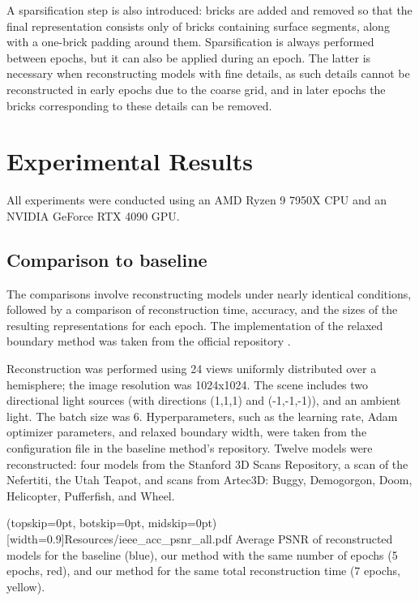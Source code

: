 \documentclass{ieeeaccess}
\begin{document}
A sparsification step is also introduced: bricks are added and removed so that the final representation consists only of bricks containing surface segments, along with a one-brick padding around them. Sparsification is always performed between epochs, but it can also be applied during an epoch. The latter is necessary when reconstructing models with fine details, as such details cannot be reconstructed in early epochs due to the coarse grid, and in later epochs the bricks corresponding to these details can be removed.

\section{Experimental Results}

All experiments were conducted using an AMD Ryzen 9 7950X CPU and an NVIDIA GeForce RTX 4090 GPU.

\subsection{Comparison to baseline}

The comparisons involve reconstructing models under nearly identical conditions, followed by a comparison of reconstruction time, accuracy, and the sizes of the resulting representations for each epoch. The implementation of the relaxed boundary method was taken from the official repository \cite{RelaxRepo}.

Reconstruction was performed using 24 views uniformly distributed over a hemisphere; the image resolution was 1024x1024. The scene includes two directional light sources (with directions (1,1,1) and (-1,-1,-1)), and an ambient light. The batch size was 6. Hyperparameters, such as the learning rate, Adam optimizer parameters, and relaxed boundary width, were taken from the configuration file in the baseline method's repository. Twelve models were reconstructed: four models from the Stanford 3D Scans Repository, a scan of the Nefertiti, the Utah Teapot, and scans from Artec3D: Buggy, Demogorgon, Doom, Helicopter, Pufferfish, and Wheel.

\Figure[t](topskip=0pt, botskip=0pt, midskip=0pt)[width=0.9\textwidth]{Resources/ieee_acc_psnr_all.pdf} {
    Average PSNR of reconstructed models for the baseline (blue), our method with the same number of epochs (5 epochs, red), and our method for the same total reconstruction time (7 epochs, yellow).\label{figPSNR57}
}
\end{document}
